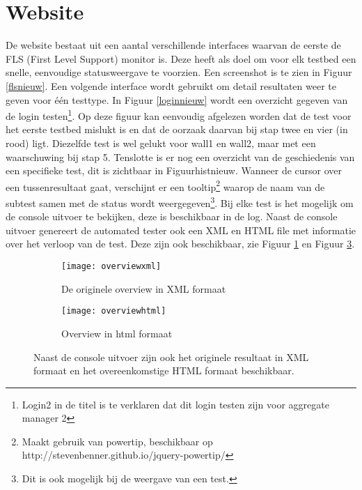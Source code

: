 \section{Website}
\npar
De website bestaat uit een aantal verschillende interfaces waarvan de eerste de FLS (First Level Support) monitor is. Deze heeft als doel om voor elk testbed een snelle, eenvoudige statusweergave te voorzien. Een screenshot is te zien in Figuur \ref{flsnieuw}.
\npar
Een volgende interface wordt gebruikt om detail resultaten weer te geven voor \'e\'en testtype. In Figuur \ref{loginnieuw} wordt een overzicht gegeven van de login testen\footnote{Login2 in de titel is te verklaren dat dit login testen zijn voor aggregate manager 2}. Op deze figuur kan eenvoudig afgelezen worden dat de test voor het eerste testbed mislukt is en dat de oorzaak daarvan bij stap twee en vier (in rood) ligt. Diezelfde test is wel gelukt voor wall1 en wall2, maar met een waarschuwing bij stap 5.
\clearpage
\npar
Tenslotte is er nog een overzicht van de geschiedenis van een specifieke test, dit is zichtbaar in Figuur{histnieuw}. Wanneer de cursor over een tussenresultaat gaat, verschijnt er een tooltip\footnote{Maakt gebruik van powertip, beschikbaar op http://stevenbenner.github.io/jquery-powertip/} waarop de naam van de subtest samen met de status wordt weergegeven\footnote{Dit is ook mogelijk bij de weergave van een test.}.
\npar 
Bij elke test is het mogelijk om de console uitvoer te bekijken, deze is beschikbaar in de log. Naast de console uitvoer genereert de automated tester ook een XML en HTML file met informatie over het verloop van de test. Deze zijn ook beschikbaar, zie Figuur \ref{overviewxml} en Figuur \ref{overviewhtml}.
\begin{figure}[H]
\centering
\begin{subfigure}{.45\textwidth}
  \centering
  \texttt{[image: overviewxml]}
  \caption{\label{overviewxml} De originele overview in XML formaat}
\end{subfigure}
\begin{subfigure}{.45\textwidth}
  \centering
  \texttt{[image: overviewhtml]}
  \caption{\label{overviewhtml}Overview in html formaat}
\end{subfigure}
\caption{Naast de console uitvoer zijn ook het originele resultaat in XML formaat en het overeenkomstige HTML formaat beschikbaar.}
\end{figure}

